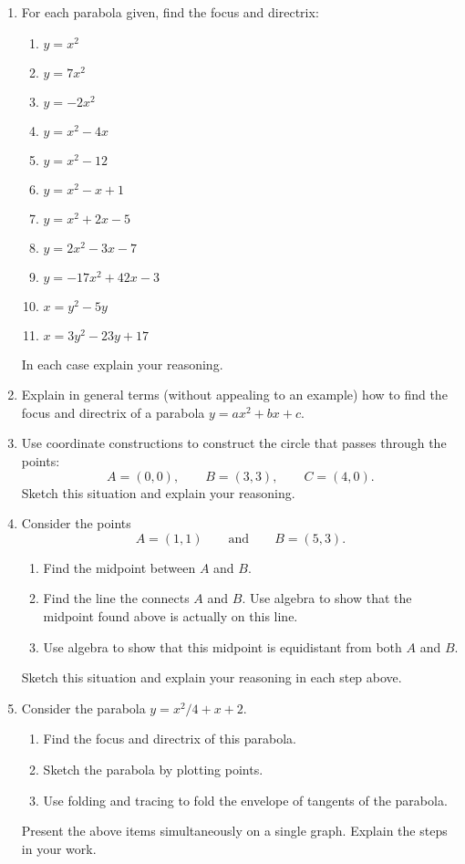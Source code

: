 \begin{problems}
\begin{enumerate}
\item For each parabola given, find the focus and directrix:
\begin{enumerate}
\item $y = x^2$ 
\item $y = 7x^2$
\item $y = -2x^2$
\item $y = x^2 - 4x$
\item $y = x^2 -12$
\item $y = x^2-x+1$
\item $y = x^2+2x-5$
\item $y = 2x^2-3x-7$
\item $y = -17x^2+42x-3$
\item $x = y^2 -5y$
\item $x = 3y^2 -23 y + 17$
\end{enumerate}
In each case explain your reasoning.
\item Explain in general terms (without appealing to an example) how
  to find the focus and directrix of a parabola $y = ax^2 + bx +c$.
\item Use coordinate constructions to construct the circle that passes
  through the points:
\[
A = (0,0), \qquad B = (3,3), \qquad C = (4,0).
\]
Sketch this situation and explain your reasoning.
\item Consider the points 
\[
A = (1,1) \qquad\text{and}\qquad B=(5,3).
\]
\begin{enumerate}
\item Find the midpoint between $A$ and $B$. 
\item Find the line the connects $A$ and $B$. Use algebra to show that
  the midpoint found above is actually on this line.
\item Use algebra to show that this midpoint is equidistant from both
  $A$ and $B$.
\end{enumerate}
Sketch this situation and explain your reasoning in each step above.

\item Consider the parabola $y = x^2/4  + x + 2$. 
\begin{enumerate}
\item Find the focus and directrix of this parabola.
\item Sketch the parabola by plotting points. 
\item Use folding and tracing to fold the envelope of tangents of the parabola.
\end{enumerate}
Present the above items simultaneously on a single graph. Explain the
steps in your work.


\end{enumerate}
\end{problems}
